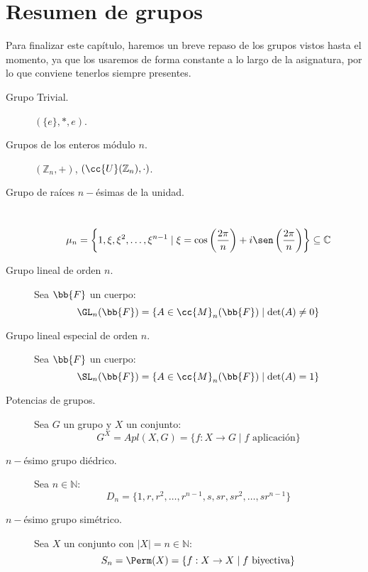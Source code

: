 \section{Resumen de grupos}
Para finalizar este capítulo, haremos un breve repaso de los grupos vistos hasta el momento, ya que los usaremos de forma constante a lo largo de la asignatura, por lo que conviene tenerlos siempre presentes.

\begin{description}
    \item [Grupo Trivial.] $(\{e\},\ast, e)$.
    \item [Grupos de los enteros módulo $n$.] $(\mathbb{Z}_n, +)$, $(\cc{U}(\mathbb{Z}_n),\cdot )$.
    \item [Grupo de raíces $n-$ésimas de la unidad.]~\\
        \begin{equation*}
            \mu_n = \left\{1,\xi,\xi^2, \ldots, \xi^{n-1}\mid \xi = \cos\left(\dfrac{2\pi}{n}\right) + i\sen\left(\dfrac{2\pi}{n}\right)\right\} \subseteq \mathbb{C}
        \end{equation*}
    \item [Grupo lineal de orden $n$.] Sea $\bb{F}$ un cuerpo:
        \begin{equation*}
            \GL_n(\bb{F}) = \{A\in \cc{M}_n(\bb{F}) \mid \det(A) \neq 0\}
        \end{equation*}
    \item [Grupo lineal especial de orden $n$.] Sea $\bb{F}$ un cuerpo:
        \begin{equation*}
            \SL_n(\bb{F}) = \{A\in \cc{M}_n(\bb{F}) \mid \det(A) = 1\}
        \end{equation*}
    \item [Potencias de grupos.] Sea $G$ un grupo y $X$ un conjunto:
        \begin{equation*}
            G^X = Apl(X, G) = \{f:X\to G \mid f \text{\ aplicación}\}
        \end{equation*}
    \item [$n-$ésimo grupo diédrico.] Sea $n\in \mathbb{N}$:
        \begin{equation*}
            D_n = \{1,r,r^2, \ldots, r^{n-1},s,sr,sr^2, \ldots, sr^{n-1}\}
        \end{equation*}
    \item [$n-$ésimo grupo simétrico.] Sea $X$ un conjunto con $|X| = n\in \mathbb{N}$:
        \begin{equation*}
            S_n = \Perm(X) = \{f:X\to X \mid f \text{\ biyectiva}\}

\end{equation*}
\end{description}
